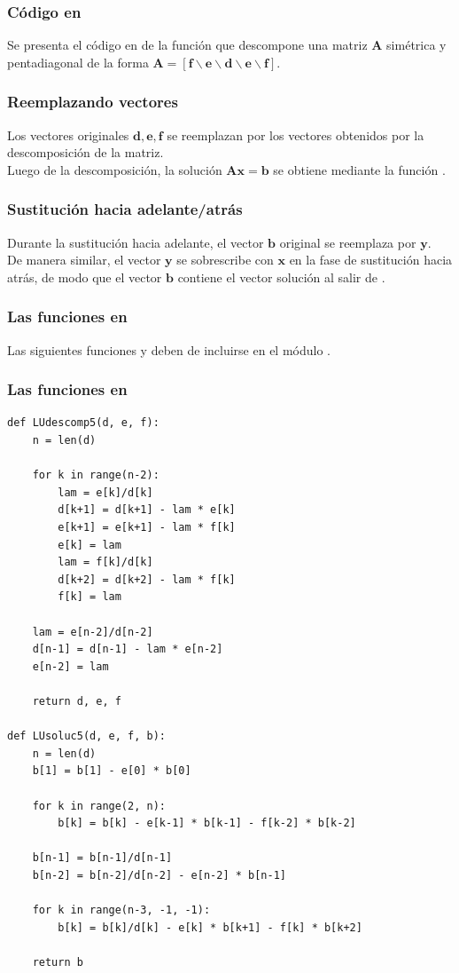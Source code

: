 \documentclass[12pt]{beamer}
\begin{document}
\begin{frame}
\frametitle{Código en \python}
Se presenta el código en \python{} de la función  que descompone una matriz $\mathbf{A}$  simétrica y pentadiagonal de la forma $\mathbf{A} = [ \mathbf{f} \backslash \mathbf{e} \backslash \mathbf{d} \backslash \mathbf{e} \backslash \mathbf{f}]$.
\end{frame}
\begin{frame}
\frametitle{Reemplazando vectores}
Los vectores originales $\mathbf{d}, \mathbf{e}, \mathbf{f}$ se reemplazan por los vectores obtenidos por la descomposición de la matriz.
\\
\bigskip
\pause
Luego de la descomposición, la solución $\mathbf{A x} = \mathbf{b}$ se obtiene mediante la función .
\end{frame}
\begin{frame}
\frametitle{Sustitución hacia adelante/atrás}
Durante la sustitución hacia adelante, el vector $\mathbf{b}$ original se reemplaza por $\mathbf{y}$.
\\
\bigskip
\pause
De manera similar, el vector $\mathbf{y}$ se sobrescribe con $\mathbf{x}$ en la fase de sustitución hacia atrás, de modo que el vector $\mathbf{b}$ contiene el vector solución al salir de .
\end{frame}
\begin{frame}
\frametitle{Las funciones en \python}
Las siguientes funciones  y  deben de incluirse en el módulo .
\end{frame}
\begin{frame}
\frametitle{Las funciones en \python}
\begin{lstlisting}[caption=Funciones para resolver una matriz simétrica y pentadiagonal]
def LUdescomp5(d, e, f):
    n = len(d)
    
    for k in range(n-2):
        lam = e[k]/d[k]
        d[k+1] = d[k+1] - lam * e[k]
        e[k+1] = e[k+1] - lam * f[k]
        e[k] = lam
        lam = f[k]/d[k]
        d[k+2] = d[k+2] - lam * f[k]
        f[k] = lam
        
    lam = e[n-2]/d[n-2]
    d[n-1] = d[n-1] - lam * e[n-2]
    e[n-2] = lam
    
    return d, e, f

def LUsoluc5(d, e, f, b):
    n = len(d)
    b[1] = b[1] - e[0] * b[0]
    
    for k in range(2, n):
        b[k] = b[k] - e[k-1] * b[k-1] - f[k-2] * b[k-2]
        
    b[n-1] = b[n-1]/d[n-1]
    b[n-2] = b[n-2]/d[n-2] - e[n-2] * b[n-1]
    
    for k in range(n-3, -1, -1):
        b[k] = b[k]/d[k] - e[k] * b[k+1] - f[k] * b[k+2]
    
    return b
\end{lstlisting}
\end{frame}
\end{document}
